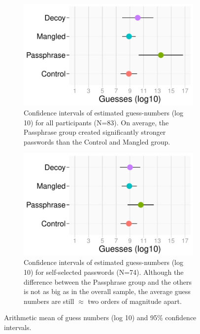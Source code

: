 \begin{figure}
	\centering
	\begin{subfigure}[c]{0.45\textwidth}
		\includegraphics[width=\textwidth]{figures/decoy/ci-guessesLog10-all}
		\caption{\label{fig:decoy:ci-guesses-all} Confidence intervals of estimated guess-numbers (log 10) for all participants (N=83). On average, the Passphrase group created significantly stronger passwords than the Control and Mangled group.}
	\end{subfigure}
	\begin{subfigure}[c]{0.45\textwidth}
		\includegraphics[width=\textwidth]{figures/decoy/ci-guessesLog10-own}
		\caption{\label{fig:decoy:ci-guesses-own}
			Confidence intervals of estimated guess-numbers (log 10) for self-selected passwords (N=74). Although the difference between the Passphrase group and the others is not as big as in the overall sample, the average guess numbers are still $\approx$ two orders of magnitude apart.}
	\end{subfigure}
	\caption{\label{fig:decoy:results-strenth} Arithmetic mean of guess numbers (log 10) and 95\% confidence intervals.} 
\end{figure}

